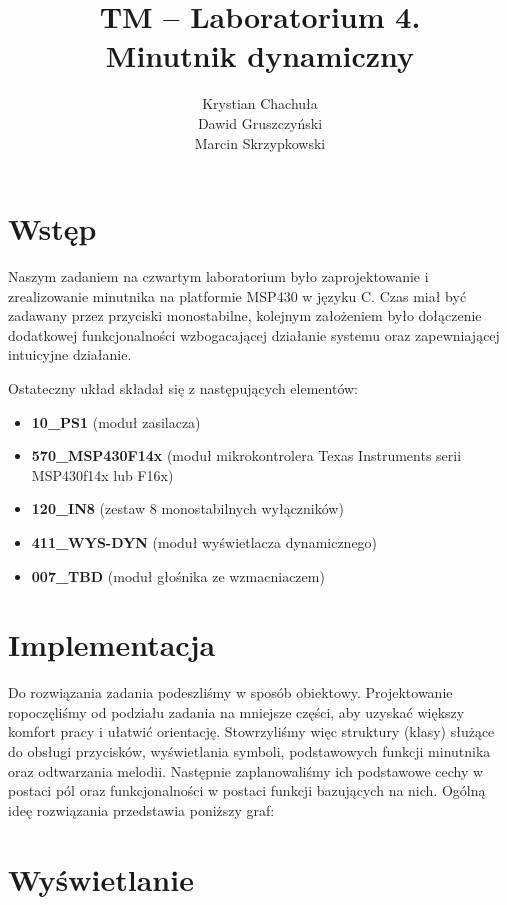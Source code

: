 \documentclass[fleqn]{article}
\title{TM -- Laboratorium 4. \\ \large Minutnik dynamiczny}
\author{Krystian Chachuła \\ Dawid Gruszczyński \\ Marcin Skrzypkowski}
\begin{document}
\maketitle

\setcounter{page}{0}
\thispagestyle{empty}

\pagebreak

\setcounter{page}{1}

\section{Wstęp}

Naszym zadaniem na czwartym laboratorium było zaprojektowanie i zrealizowanie minutnika na platformie MSP430 w języku C. Czas miał być zadawany przez przyciski monostabilne, kolejnym założeniem było dołączenie dodatkowej funkcjonalności wzbogacającej działanie systemu oraz zapewniającej intuicyjne działanie.

Ostateczny układ składał się z następujących elementów:

\begin{itemize}
	\item \textbf{10\_PS1} (moduł zasilacza)
	\item \textbf{570\_MSP430F14x} (moduł mikrokontrolera Texas Instruments serii MSP430f14x lub F16x)
	\item \textbf{120\_IN8} (zestaw 8 monostabilnych wyłączników)
	\item \textbf{411\_WYS-DYN} (moduł wyświetlacza dynamicznego)
	\item \textbf{007\_TBD} (moduł głośnika ze wzmacniaczem)
\end{itemize}

\section{Implementacja}

Do rozwiązania zadania podeszliśmy w sposób obiektowy. Projektowanie ropoczęliśmy od podziału zadania na mniejsze części, aby uzyskać większy komfort pracy i ułatwić orientację. Stowrzyliśmy więc struktury (klasy) służące do obsługi przycisków, wyświetlania symboli, podstawowych funkcji minutnika oraz odtwarzania melodii. Następnie zaplanowaliśmy ich podstawowe cechy w postaci pól oraz funkcjonalności w postaci funkcji bazujących na nich. Ogólną ideę rozwiązania przedstawia poniższy graf: %


\section{Wyświetlanie}
\end{document}
